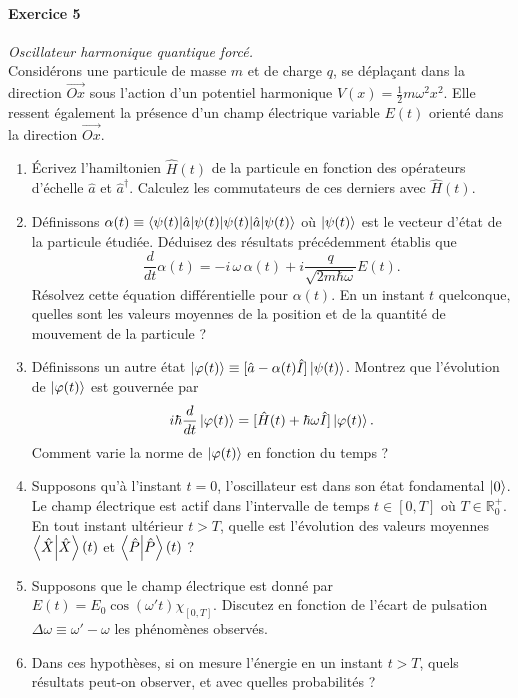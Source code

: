 \paragraph{Exercice 5} \textit{Oscillateur harmonique quantique forcé.} \\
Considérons une particule de masse $m$ et de charge $q$, se déplaçant dans la direction $\vec{Ox}$ sous l'action d'un potentiel harmonique $V(x) = \frac{1}{2}m\omega^2 x^2$. Elle ressent également la présence d'un champ électrique variable $E(t)$ orienté dans la direction $\vec{Ox}$.
\begin{enumerate}
\item Écrivez l'hamiltonien $\hat H(t)$ de la particule en fonction des opérateurs d'échelle $\hat a$ et $\hat a^\dagger$. Calculez les commutateurs de ces derniers avec $\hat H(t)$. 
\item Définissons $\alpha(t) \equiv \braket{\psi(t)|\hat a|\psi(t)}$ où $\ket{\psi(t)}$ est le vecteur d'état de la particule étudiée. Déduisez des résultats précédemment établis que
\begin{equation}
\frac{d}{dt} \alpha(t) = -i\, \omega \, \alpha (t) + i \frac{q}{\sqrt{2m\hbar\omega}}E(t).
\end{equation}
Résolvez cette équation différentielle pour $\alpha(t)$. En un instant $t$ quelconque, quelles sont les valeurs moyennes de la position et de la quantité de mouvement de la particule ?
\item Définissons un autre état $\ket{\varphi(t)} \equiv [\hat a - \alpha(t) \hat I]\ket{\psi(t)}$. Montrez que l'évolution de $\ket{\varphi(t)}$ est gouvernée par
\begin{equation}
i\hbar \frac{d}{dt} \ket{\varphi(t)} = [\hat H(t) + \hbar \omega \hat I] \ket{\varphi(t)}.
\end{equation}
Comment varie la norme de $\ket{\varphi(t)}$ en fonction du temps ?
\item Supposons qu'à l'instant $t=0$, l'oscillateur est dans son état fondamental $\ket{0}$. Le champ électrique est actif dans l'intervalle de temps $t\in[0,T]$ où $T \in \mathbb{R}_0^+$. En tout instant ultérieur $t>T$, quelle est l'évolution des valeurs moyennes $\braket{\hat X}(t)$ et $\braket{\hat P}(t)$ ?
\item Supposons que le champ électrique est donné par $E(t) = E_0 \cos (\omega't) \chi_{[0,T]}$. Discutez en fonction de l'écart de pulsation $\Delta \omega \equiv \omega'-\omega$ les phénomènes observés.
\item Dans ces hypothèses, si on mesure l'énergie en un instant $t>T$, quels résultats peut-on observer, et avec quelles probabilités ?
\end{enumerate}